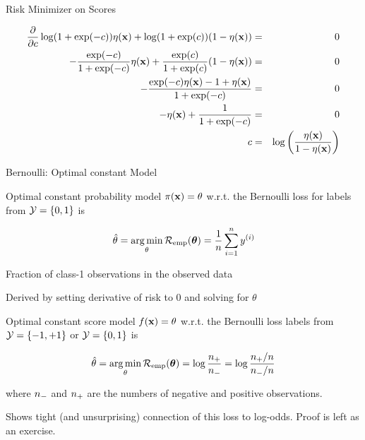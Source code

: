 \documentclass[11pt,compress,t,notes=noshow, xcolor=table]{beamer}
\begin{document}
\begin{vbframe}{Risk Minimizer on Scores}
\begin{footnotesize}
  \begin{eqnarray*}
  \frac{\partial }{\partial c} \log(1 + \exp(-c)) \eta(\mathbf{x})+ \log(1 + \exp(c)) (1 - \eta(\mathbf{x})) &=& 0 \\
  - \frac{\exp(-c)}{1 + \exp(-c)} \eta(\mathbf{x}) + \frac{\exp(c)}{1 + \exp(c)} (1 - \eta(\mathbf{x})) &=& 0 \\ 
  - \frac{\exp(-c) \eta(\mathbf{x}) - 1 + \eta(\mathbf{x})}{1 + \exp(-c)} &=& 0 \\
  - \eta(\mathbf{x}) + \frac{1}{1 + \exp(-c)} &=& 0\\
   c &=& \log\left(\frac{\eta(\mathbf{x})}{1 - \eta(\mathbf{x})}\right)
  \end{eqnarray*}
\end{footnotesize}

\end{vbframe}



\begin{vbframe}{Bernoulli: Optimal constant Model}

{\small 

\begin{itemizeS}
    \item Optimal constant probability model $\pi(\mathbf{x}) = \theta$ w.r.t. the Bernoulli loss for labels from $\mathcal{Y} = \{0, 1\}$ is 
    
    $$\hat{\theta} = \mathop{\mathrm{arg\,min}}_{\theta} \mathcal{R}_{\text{emp}}(\bm{\theta}) = \frac{1}{n} \sum\limits_{i=1}^n y^{(i)}$$
    \item Fraction of class-1 observations in the observed data
    \item Derived by setting derivative of risk to $0$ and solving for $\theta$
    \item Optimal constant score model $f(\mathbf{x}) = \theta$ w.r.t. the Bernoulli loss labels from $\mathcal{Y} = \{-1, +1\}$ or $\mathcal{Y} = \{0, 1\}$ is

    $$\hat{\theta} = \mathop{\mathrm{arg\,min}}_{\theta} \mathcal{R}_{\text{emp}}(\bm{\theta}) = \log \frac{n_{+}}{n_{-}} = \log \frac{n_{+} / n}{n_{-} /n}$$ 

    where $n_{-}$ and $n_{+}$ are the numbers of negative and positive observations.%

    \item Shows tight (and unsurprising) connection of this loss to log-odds. Proof is left as an exercise.
\end{itemizeS}

}





\end{vbframe}
\end{document}

